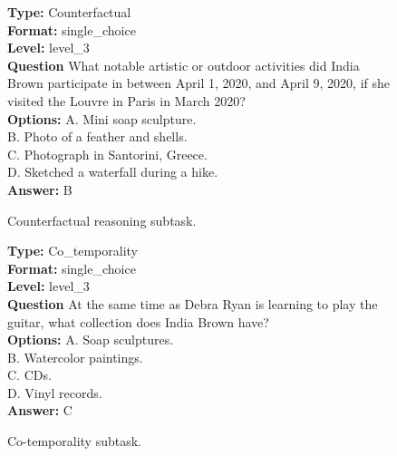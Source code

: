 \documentclass{article} %
\begin{document}
\begin{figure}[htbp]
\begin{tcolorbox}[
colframe=black!75!white, 
colback=white, sharp corners, 
boxrule=0.8pt, width=\textwidth,
title=Counterfactual
] 
\textbf{Type:} Counterfactual \\
\textbf{Format:} single\_choice \\
\textbf{Level:} level\_3 \\
\textbf{Question} What notable artistic or outdoor activities did India Brown participate in between April 1, 2020, and April 9, 2020, if she visited the Louvre in Paris in March 2020? \\
\textbf{Options:} A. Mini soap sculpture. \\
B. Photo of a feather and shells. \\
C. Photograph in Santorini, Greece. \\
D. Sketched a waterfall during a hike. \\
\textbf{Answer:} B
\end{tcolorbox} 
\caption{Counterfactual reasoning subtask.}
\label{fig:counterfactual_reasoning}
\end{figure}

\begin{figure}[htbp]
\begin{tcolorbox}[
colframe=black!75!white, 
colback=white, sharp corners, 
boxrule=0.8pt, width=\textwidth,
title=Co-temporality
] 
\textbf{Type:} Co\_temporality \\
\textbf{Format:} single\_choice \\
\textbf{Level:} level\_3 \\
\textbf{Question} At the same time as Debra Ryan is learning to play the guitar, what collection does India Brown have? \\
\textbf{Options:} A. Soap sculptures. \\
B. Watercolor paintings. \\
C. CDs. \\
D. Vinyl records. \\
\textbf{Answer:} C
\end{tcolorbox} 
\caption{Co-temporality subtask.}
\label{fig:co-temporality}
\end{figure}
\end{document}
